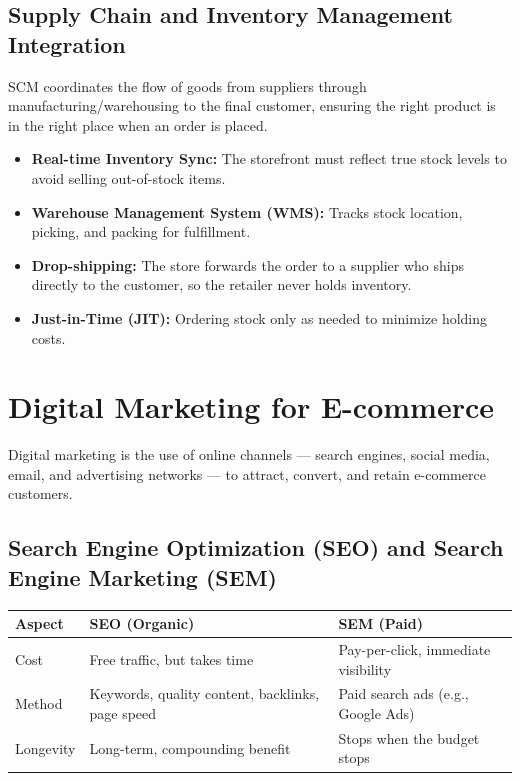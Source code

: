 \documentclass[11pt,a4paper]{article}
\begin{document}
\subsection{Supply Chain and Inventory Management Integration}
\begin{definitionbox}
SCM coordinates the flow of goods from suppliers through manufacturing/warehousing to the final customer, ensuring the right product is in the right place when an order is placed.
\end{definitionbox}
\begin{itemize}[leftmargin=*]
  \item \textbf{Real-time Inventory Sync:} The storefront must reflect true stock levels to avoid selling out-of-stock items.
  \item \textbf{Warehouse Management System (WMS):} Tracks stock location, picking, and packing for fulfillment.
  \item \textbf{Drop-shipping:} The store forwards the order to a supplier who ships directly to the customer, so the retailer never holds inventory.
  \item \textbf{Just-in-Time (JIT):} Ordering stock only as needed to minimize holding costs.
\end{itemize}

\section{Digital Marketing for E-commerce}

\begin{definitionbox}
Digital marketing is the use of online channels --- search engines, social media, email, and advertising networks --- to attract, convert, and retain e-commerce customers.
\end{definitionbox}

\subsection{Search Engine Optimization (SEO) and Search Engine Marketing (SEM)}
\begin{center}
\begin{tabular}{@{}p{2.6cm}p{5.2cm}p{5.2cm}@{}}
\toprule
\rowcolor{primary!15}
\textbf{Aspect} & \textbf{SEO (Organic)} & \textbf{SEM (Paid)} \\
\midrule
Cost & Free traffic, but takes time & Pay-per-click, immediate visibility \\
Method & Keywords, quality content, backlinks, page speed & Paid search ads (e.g., Google Ads) \\
Longevity & Long-term, compounding benefit & Stops when the budget stops \\
\bottomrule
\end{tabular}
\end{center}
\end{document}

